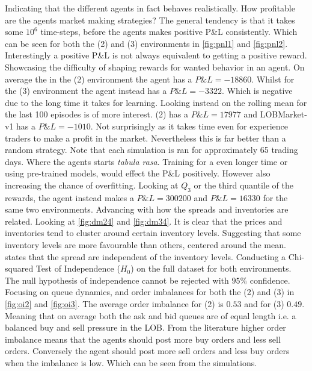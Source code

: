 \documentclass{kththesis}
\theoremstyle{definition}
\begin{document}
\newpage
Indicating that the different agents in fact behaves realistically. How profitable are the agents market making strategies? The general tendency is that it takes some $10^{6}$ time-steps, before the agents makes positive P\&L consistently. Which can be seen for both the (2) and (3) environments in \autoref{fig:pnl1} and \autoref{fig:pnl2}. Interestingly a positive P\&L is not always equivalent to getting a positive reward. Showcasing the difficulty of shaping rewards for wanted behavior in an agent. On average the in the (2) environment the agent has a $P\&L = -18860$. Whilst for the (3) environment the agent instead has a $P\&L = -3322 $. Which is negative due to the long time it takes for learning. 
\newline
\newline
Looking instead on the rolling mean for the last 100 episodes is of more interest. (2) has a $P\&L = 17977$ and LOBMarket-v1 has a $P\&L = -1010$.  Not surprisingly as it takes time even for experience traders to make a profit in the market. Nevertheless this is far better than a random strategy. Note that each simulation is ran for approximately 65 trading days. Where the agents starts \textit{tabula rasa}. Training for a even longer time or using pre-trained models, would effect the P\&L positively. However also increasing the chance of overfitting.  Looking at $Q_3$ or the third quantile of the rewards, the agent instead makes a $P\&L = 300200$ and $P\&L = 16330$ for the same two environments. 
\newline
\newline
Advancing with how the spreads and inventories are related.
Looking at \autoref{fig:dm24} and \autoref{fig:dm34}. It is clear that the prices and inventories tend to cluster around certain inventory levels. Suggesting that some inventory levels are more favourable than others, centered around the mean. \textcite{ho1981optimal} states that the spread are independent of the inventory levels. Conducting a Chi-squared Test of Independence ($H_0$) on the full dataset for both environments. The null hypothesis of independence cannot be rejected with $95\%$ confidence. 
\newline
\newline
Focusing on queue dynamics, and  order imbalances for both the (2) and (3) in \autoref{fig:oi2} and \autoref{fig:oi3}. The average order imbalance for (2) is $0.53$ and for (3) $0.49$. Meaning that on average both the ask and bid queues are of equal length i.e. a balanced buy and sell pressure in the LOB. From the literature \parencite{bouchaud2018trades, cartea2015algorithmic} higher order imbalance means that the agents should post more buy orders and less sell orders. Conversely the agent should post more sell orders and less buy orders when the imbalance is low. Which can be seen from the simulations. 
\end{document}
